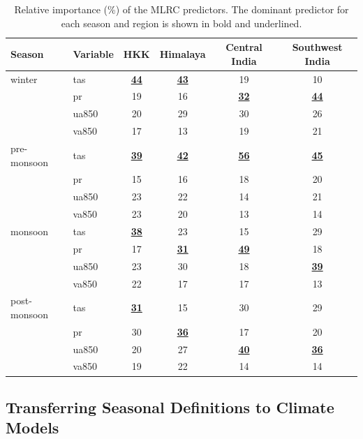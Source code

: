 \begin{table}[H]
\centering
\caption{Relative importance (\%) of the MLRC predictors. The dominant predictor for each season and region is shown in bold and underlined.}
\begin{tabular}{llcccc}
\hline
Season & Variable & HKK & Himalaya & Central India & Southwest India \\
\hline

winter
& tas   & \underline{\textbf{44}} & \underline{\textbf{43}} & 19 & 10 \\
& pr & 19 & 16 & \underline{\textbf{32}} & \underline{\textbf{44}} \\
& ua850          & 20 & 29 & 30 & 26 \\
& va850          & 17 & 13 & 19 & 21 \\
\hline

pre-monsoon
& tas   & \underline{\textbf{39}} & \underline{\textbf{42}} & \underline{\textbf{56}} & \underline{\textbf{45}} \\
& pr & 15 & 16 & 18 & 20 \\
& ua850          & 23 & 22 & 14 & 21 \\
& va850          & 23 & 20 & 13 & 14 \\
\hline

monsoon
& tas   & \underline{\textbf{38}} & 23 & 15 & 29 \\
& pr & 17 & \underline{\textbf{31}} & \underline{\textbf{49}} & 18 \\
& ua850          & 23 & 30 & 18 & \underline{\textbf{39}} \\
& va850          & 22 & 17 & 17 & 13 \\
\hline

post-monsoon
& tas   & \underline{\textbf{31}} & 15 & 30 & 29 \\
& pr & 30 & \underline{\textbf{36}} & 17 & 20 \\
& ua850          & 20 & 27 & \underline{\textbf{40}} & \underline{\textbf{36}} \\
& va850          & 19 & 22 & 14 & 14 \\
\hline

\end{tabular}
\label{tab:feature_importance}
\end{table}


\subsection{Transferring Seasonal Definitions to Climate Models}

